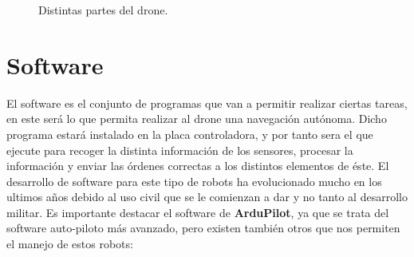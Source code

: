 \begin{figure}[H]
 \centering
 \caption{Distintas partes del drone.}
 \label{f:Test 1}
\end{figure} 


\section{Software}
\hspace{1 cm} El software es el conjunto de programas que van a permitir realizar ciertas tareas, en este ser\'a lo que permita realizar al drone una navegaci\'on aut\'onoma. Dicho programa estar\'a instalado en la placa controladora, y por tanto sera el que ejecute para recoger la distinta informaci\'on de los sensores, procesar la informaci\'on y enviar las \'ordenes correctas a los distintos elementos de \'este. El desarrollo de software para este tipo de robots ha evolucionado mucho en los ultimos años debido al uso civil que se le comienzan a dar y no tanto al desarrollo militar. Es importante destacar el software de \textbf{ArduPilot}, ya que se trata del software auto-piloto m\'as avanzado, pero existen tambi\'en otros que nos permiten el manejo de estos robots:

